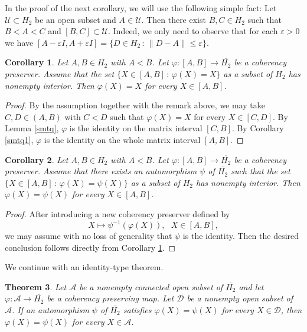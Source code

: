 \documentclass[10pt]{amsart}
\newtheorem{theorem}{Theorem}[section]
\newtheorem{corollary}[theorem]{Corollary}
\theoremstyle{definition}
\theoremstyle{remark}
\numberwithin{subsection}{section}
\numberwithin{equation}{section}
\newcommand\oH{{\overline{H_2}}}
\begin{document}
In the proof of the next corollary, we will use the following simple fact: Let $\mathcal{U} \subset H_2$ be an open subset and $A \in \mathcal{U}$. Then there exist $B,C \in H_2$ such that $B < A < C$ and $[B,C] \subset \mathcal{U}$. Indeed, we only need to observe that for each $\varepsilon > 0$ we have $[ A- \varepsilon I, A + \varepsilon I ] = \{ D \in H_2 \, : \, \| D-A \| \le \varepsilon \}$.

\begin{corollary}\label{smtq2}
Let $A,B\in H_2$ with $A < B$. Let $\varphi \colon [A,B] \to \oH$ 
be a coherency preserver. Assume that 
the set $\{X\in [A, B]\,:\, \varphi (X) = X\}$ as a subset of $H_2$ has nonempty interior.
Then $\varphi (X) = X$ for every $X \in [A,B]$.
\end{corollary}

\begin{proof}
By the assumption together with the remark above, we may take $C, D\in (A, B)$ with $C<D$ such that $\varphi(X)=X$ for every $X\in [C, D]$. 
By Lemma \ref{smtq}, $\varphi$ is the identity on the matrix interval $[C, B]$. By Corollary \ref{smtq1}, $\varphi$ is the identity on the whole matrix interval $[A,B]$.
\end{proof}

\begin{corollary}\label{kiakia}
Let $A,B\in H_2$ with $A < B$. Let $\varphi \colon [A,B] \to \oH$ 
be a coherency preserver. 
Assume that there exists an automorphism $\psi$ of $\oH$
such that the set $\{X\in [A, B]\,:\, \varphi (X) = \psi (X) \}$ as a subset of $H_2$ has nonempty interior.
Then $\varphi (X) = \psi (X)$ for every $X \in [A,B]$.
\end{corollary}

\begin{proof}
After introducing a new coherency preserver defined by
\[
X \mapsto \psi^{-1} (\varphi (X)), \ \ \ X \in [A,B],
\]
we may assume with no loss of generality that $\psi$ is the identity. Then the desired conclusion follows directly from Corollary \ref{smtq2}.
\end{proof}



We continue with an identity-type theorem. 

\begin{theorem}\label{identity}
Let $\mathcal{A}$ be a nonempty connected open subset of $\oH$ and let $\varphi \colon \mathcal{A} \to \oH$ be a coherency preserving map. Let $\mathcal{D}$ be a nonempty open subset of $\mathcal{A}$. If an automorphism $\psi$ of $\oH$
satisfies $\varphi (X) = \psi (X)$ for every $X \in \mathcal{D}$, then $\varphi (X) = \psi (X)$ for every $X \in \mathcal{A}$.
\end{theorem}
\end{document}
